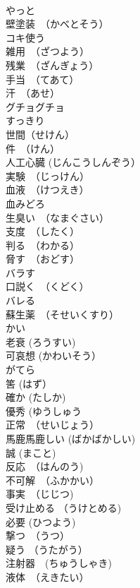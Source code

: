 \documentclass[8pt]{extreport}
\begin{document}
\begin{CJK}{UTF8}{min}
\\	やっと	
\\	壁塗装　（かべとそう）	
\\	コキ使う	
\\	雑用　（ざつよう）	
\\	残業　（ざんぎょう）	
\\	手当　（てあて）	
\\	汗　（あせ）	
\\	グチョグチョ	
\\	すっきり	
\\	世間（せけん）	
\\	件　（けん）	
\\	人工心臓 (じんこうしんぞう）	
\\	実験　（じっけん）	
\\	血液　（けつえき）	
\\	血みどろ	
\\	生臭い　（なまぐさい）	
\\	支度　（したく）	
\\	判る　（わかる）	
\\	脅す　（おどす）	
\\	バラす	
\\	口説く　（くどく）	
\\	バレる	
\\	蘇生薬　（そせいくすり）	
\\	かい	
\\	老衰 (ろうすい)	
\\	可哀想 (かわいそう）	
\\	がてら	
\\	筈 (はず）	
\\	確か (たしか)	
\\	優秀 (ゆうしゅう	
\\	正常　（せいじょう）	
\\	馬鹿馬鹿しい (ばかばかしい)	
\\	誠 (まこと)	
\\	反応　（はんのう)	
\\	不可解　（ふかかい）	
\\	事実　（じじつ)	
\\	受け止める （うけとめる)	
\\	必要 (ひつよう)	
\\	撃つ　（うつ）	
\\	疑う （うたがう）	
\\	注射器　(ちゅうしゃき)	
\\	液体　（えきたい）	

\end{CJK}
\end{document}
